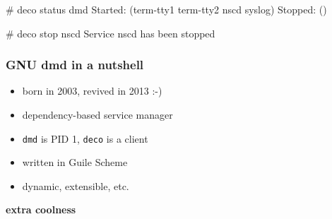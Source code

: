 \documentclass{beamer}
\begin{document}
\begin{frame}
  \begin{semiverbatim}
# deco status dmd
Started: (term-tty1 term-tty2 nscd syslog)
Stopped: ()

# deco stop nscd
Service nscd has been stopped
  \end{semiverbatim}

\end{frame}

\begin{frame}
  \frametitle{GNU dmd in a nutshell}

  \large{
  \begin{itemize}
    \item born in \alert{2003}, revived in 2013 :-)
    \item dependency-based service manager
    \item<2-> \texttt{dmd} is PID 1, \texttt{deco} is a client
    \item<3-> written in \alert{Guile} Scheme
    \item<3-> dynamic, extensible, etc.
  \end{itemize}}
\end{frame}


\begin{frame}
  \begin{centering}
    \Huge{\textbf{extra coolness}}
  \end{centering}

\end{frame}
\end{document}
